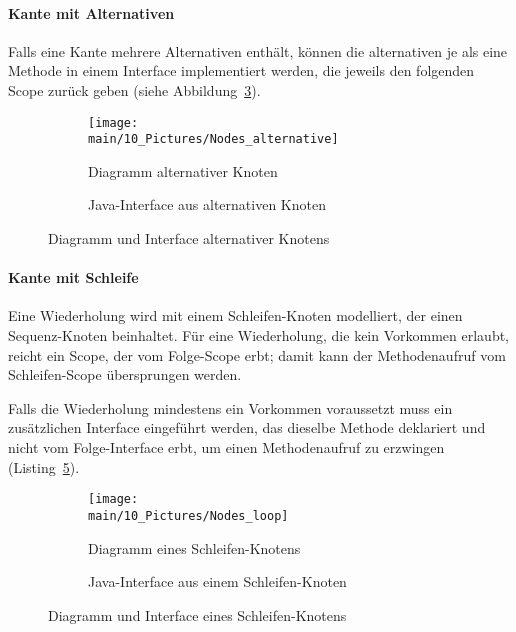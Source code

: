 \documentclass[../InterneDSLs.tex]{subfiles}
\begin{document}
\paragraph{Kante mit Alternativen}
Falls eine Kante mehrere Alternativen enthält, können die alternativen je als eine Methode in einem Interface implementiert werden, die jeweils den folgenden Scope zurück geben (siehe Abbildung~\ref{FIG:AlternativeNode}).
\begin{figure}[ht]
\centering
  \begin{subfigure}[c]{0.49\textwidth}
    \texttt{[image: \\main/10\_Pictures/Nodes\_alternative]}
    \caption{Diagramm alternativer Knoten}
    \label{FIG:DiagramAlternativeNode}
  \end{subfigure}
  \begin{subfigure}[c]{0.49\textwidth}
    
    \caption{Java-Interface aus alternativen Knoten}
    \label{FIG:JInterfaceAlternativeNode}
  \end{subfigure}
  \caption{Diagramm und Interface alternativer Knotens}
  \label{FIG:AlternativeNode}
\end{figure}

\paragraph{Kante mit Schleife}
Eine Wiederholung wird mit einem Schleifen-Knoten modelliert, der einen Sequenz-Knoten beinhaltet. Für eine Wiederholung, die kein Vorkommen erlaubt, reicht ein Scope, der vom Folge-Scope erbt; damit kann der Methodenaufruf vom Schleifen-Scope übersprungen werden.

Falls die Wiederholung mindestens ein Vorkommen voraussetzt muss ein zusätzlichen Interface eingeführt werden, das dieselbe Methode deklariert und nicht vom Folge-Interface erbt, um einen Methodenaufruf zu erzwingen (Listing~\ref{FIG:JInterfaceLoopNode}).
\begin{figure}[ht]
\centering
  \begin{subfigure}[c]{0.49\textwidth}
    \texttt{[image: \\main/10\_Pictures/Nodes\_loop]}
    \caption{Diagramm eines Schleifen-Knotens}
    \label{FIG:DiagramLoopNode}
  \end{subfigure}
  \begin{subfigure}[c]{0.49\textwidth}
    
    \caption{Java-Interface aus einem Schleifen-Knoten}
    \label{FIG:JInterfaceLoopNode}
  \end{subfigure}
  \caption{Diagramm und Interface eines Schleifen-Knotens}
  \label{FIG:LoopNode}
\end{figure}
\end{document}
